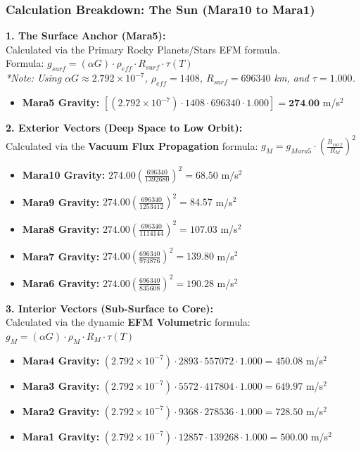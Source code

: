 \documentclass[11pt, a4paper]{article}
\begin{document}
\clearpage
\subsubsection{Calculation Breakdown: The Sun (Mara10 to Mara1)}

\noindent \textbf{1. The Surface Anchor (Mara5):} \\
Calculated via the Primary Rocky Planets/Stars EFM formula. \\
Formula: $g_{surf} = (\alpha G) \cdot \rho_{eff} \cdot R_{surf} \cdot \tau(T)$ \\
\textit{*Note: Using $\alpha G \approx 2.792 \times 10^{-7}$, $\rho_{eff} = 1408$, $R_{surf} = 696340$ km, and $\tau = 1.000$.}
\begin{itemize}
  \item \textbf{Mara5 Gravity:} $\left[ (2.792 \times 10^{-7}) \cdot 1408 \cdot 696340 \cdot 1.000 \right] = \textbf{274.00}$ m/s$^2$
\end{itemize}

\vspace{0.5em}
\noindent \textbf{2. Exterior Vectors (Deep Space to Low Orbit):} \\
Calculated via the \textbf{Vacuum Flux Propagation} formula: $g_M = g_{Mara5} \cdot \left( \frac{R_{surf}}{R_M} \right)^2$
\begin{itemize}
  \item \textbf{Mara10 Gravity:} $274.00 \left( \frac{696340}{1392680} \right)^2 = 68.50$ m/s$^2$
  \item \textbf{Mara9 Gravity:} $274.00 \left( \frac{696340}{1253412} \right)^2 = 84.57$ m/s$^2$
  \item \textbf{Mara8 Gravity:} $274.00 \left( \frac{696340}{1114144} \right)^2 = 107.03$ m/s$^2$
  \item \textbf{Mara7 Gravity:} $274.00 \left( \frac{696340}{974876} \right)^2 = 139.80$ m/s$^2$
  \item \textbf{Mara6 Gravity:} $274.00 \left( \frac{696340}{835608} \right)^2 = 190.28$ m/s$^2$
\end{itemize}

\vspace{0.5em}
\noindent \textbf{3. Interior Vectors (Sub-Surface to Core):} \\
Calculated via the dynamic \textbf{EFM Volumetric} formula: $g_M = (\alpha G) \cdot \rho_{M} \cdot R_M \cdot \tau(T)$ \\
\begin{itemize}
  \item \textbf{Mara4 Gravity:} $(2.792 \times 10^{-7}) \cdot 2893 \cdot 557072 \cdot 1.000 = 450.08$ m/s$^2$
  \item \textbf{Mara3 Gravity:} $(2.792 \times 10^{-7}) \cdot 5572 \cdot 417804 \cdot 1.000 = 649.97$ m/s$^2$
  \item \textbf{Mara2 Gravity:} $(2.792 \times 10^{-7}) \cdot 9368 \cdot 278536 \cdot 1.000 = 728.50$ m/s$^2$
  \item \textbf{Mara1 Gravity:} $(2.792 \times 10^{-7}) \cdot 12857 \cdot 139268 \cdot 1.000 = 500.00$ m/s$^2$
\end{itemize}
\end{document}
